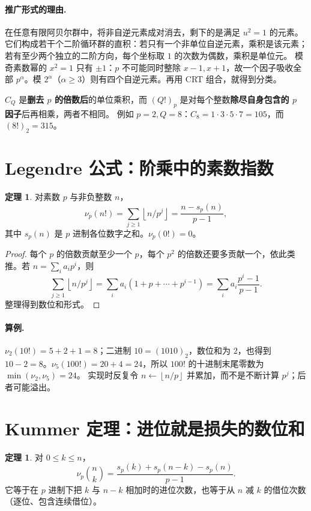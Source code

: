 \documentclass[UTF8,a4paper,11pt,oneside,openany,fontset=fandol]{ctexbook}
\theoremstyle{definition}
\newtheorem{theorem}[definition]{定理}
\newcommand{\floor}[1]{\left\lfloor #1\right\rfloor}
\begin{document}
\paragraph{推广形式的理由.}
在任意有限阿贝尔群中，将非自逆元素成对消去，剩下的是满足 $u^2=1$ 的元素。它们构成若干个二阶循环群的直积：若只有一个非单位自逆元素，乘积是该元素；若有至少两个独立的二阶方向，每个坐标取 $1$ 的次数为偶数，乘积是单位元。
模奇素数幂的 $x^2=1$ 只有 $\pm1$：$p$ 不可能同时整除 $x-1,x+1$，故一个因子吸收全部 $p^\alpha$。模 $2^\alpha$（$\alpha\ge3$）则有四个自逆元素。再用 CRT 组合，就得到分类。
\begin{pitfall}
$C_Q$ 是\textbf{删去 $p$ 的倍数后}的单位乘积，而 $(Q!)_p$ 是对每个整数\textbf{除尽自身包含的 $p$ 因子}后再相乘，两者不相同。
例如 $p=2,Q=8$：$C_8=1\cdot3\cdot5\cdot7=105$，而 $(8!)_2=315$。
\end{pitfall}


\section{Legendre 公式：阶乘中的素数指数}
\begin{theorem}
对素数 $p$ 与非负整数 $n$，
\[
 \nu_p(n!)=\sum_{j\ge1}\floor{n/p^j}
 =\frac{n-s_p(n)}{p-1},
\]
其中 $s_p(n)$ 是 $p$ 进制各位数字之和。$\nu_p(0!)=0$。
\end{theorem}
\begin{proof}
每个 $p$ 的倍数贡献至少一个 $p$，每个 $p^2$ 的倍数还要多贡献一个，依此类推。若 $n=\sum_i a_ip^i$，则
\[
\sum_{j\ge1}\floor{n/p^j}
=\sum_i a_i(1+p+\cdots+p^{i-1})
=\sum_i a_i\frac{p^i-1}{p-1}.
\]
整理得到数位和形式。
\end{proof}

\paragraph{算例.} $\nu_2(10!)=5+2+1=8$；二进制 $10=(1010)_2$，数位和为 $2$，也得到 $10-2=8$。$\nu_5(100!)=20+4=24$，所以 $100!$ 的十进制末尾零数为 $\min(\nu_2,\nu_5)=24$。
实现时反复令 $n\gets\floor{n/p}$ 并累加，而不是不断计算 $p^j$；后者可能溢出。


\section{Kummer 定理：进位就是损失的数位和}
\begin{theorem}
对 $0\le k\le n$，
\[
\nu_p\binom nk=\frac{s_p(k)+s_p(n-k)-s_p(n)}{p-1}.
\]
它等于在 $p$ 进制下把 $k$ 与 $n-k$ 相加时的进位次数，也等于从 $n$ 减 $k$ 的借位次数（逐位、包含连续借位）。
\end{theorem}
\end{document}
